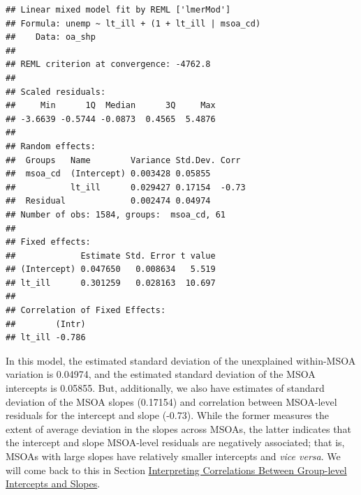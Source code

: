 \documentclass[]{book}
\newenvironment{Shaded}{\begin{snugshade}}{\end{snugshade}}
\newcommand{\KeywordTok}[1]{\textcolor[rgb]{0.13,0.29,0.53}{\textbf{#1}}}
\newcommand{\DataTypeTok}[1]{\textcolor[rgb]{0.13,0.29,0.53}{#1}}
\newcommand{\DecValTok}[1]{\textcolor[rgb]{0.00,0.00,0.81}{#1}}
\newcommand{\StringTok}[1]{\textcolor[rgb]{0.31,0.60,0.02}{#1}}
\newcommand{\CommentTok}[1]{\textcolor[rgb]{0.56,0.35,0.01}{\textit{#1}}}
\newcommand{\OperatorTok}[1]{\textcolor[rgb]{0.81,0.36,0.00}{\textbf{#1}}}
\newcommand{\NormalTok}[1]{#1}
\begin{document}
\begin{Shaded}
\end{Shaded}

\begin{verbatim}
## Linear mixed model fit by REML ['lmerMod']
## Formula: unemp ~ lt_ill + (1 + lt_ill | msoa_cd)
##    Data: oa_shp
## 
## REML criterion at convergence: -4762.8
## 
## Scaled residuals: 
##     Min      1Q  Median      3Q     Max 
## -3.6639 -0.5744 -0.0873  0.4565  5.4876 
## 
## Random effects:
##  Groups   Name        Variance Std.Dev. Corr 
##  msoa_cd  (Intercept) 0.003428 0.05855       
##           lt_ill      0.029427 0.17154  -0.73
##  Residual             0.002474 0.04974       
## Number of obs: 1584, groups:  msoa_cd, 61
## 
## Fixed effects:
##             Estimate Std. Error t value
## (Intercept) 0.047650   0.008634   5.519
## lt_ill      0.301259   0.028163  10.697
## 
## Correlation of Fixed Effects:
##        (Intr)
## lt_ill -0.786
\end{verbatim}

In this model, the estimated standard deviation of the unexplained
within-MSOA variation is 0.04974, and the estimated standard deviation
of the MSOA intercepts is 0.05855. But, additionally, we also have
estimates of standard deviation of the MSOA slopes (0.17154) and
correlation between MSOA-level residuals for the intercept and slope
(-0.73). While the former measures the extent of average deviation in
the slopes across MSOAs, the latter indicates that the intercept and
slope MSOA-level residuals are negatively associated; that is, MSOAs
with large slopes have relatively smaller intercepts and \emph{vice
versa}. We will come back to this in Section
\protect\hyperlink{interpreting-correlations-between-group-level-intercepts-and-slopes}{Interpreting
Correlations Between Group-level Intercepts and Slopes}.
\end{document}
